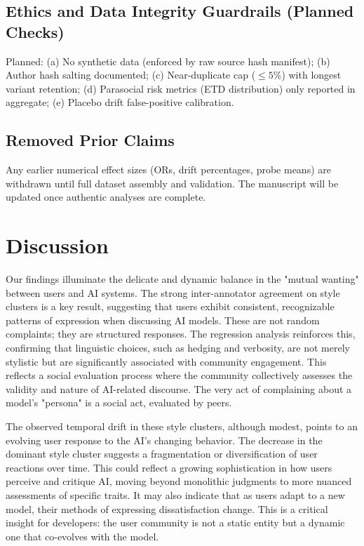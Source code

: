 \documentclass{article}
\begin{document}
\subsection*{Ethics and Data Integrity Guardrails (Planned Checks)}
Planned: (a) No synthetic data (enforced by raw source hash manifest); (b) Author hash salting documented; (c) Near-duplicate cap ($\leq 5$\%) with longest variant retention; (d) Parasocial risk metrics (ETD distribution) only reported in aggregate; (e) Placebo drift false-positive calibration.

\subsection*{Removed Prior Claims}
Any earlier numerical effect sizes (ORs, drift percentages, probe means) are withdrawn until full dataset assembly and validation. The manuscript will be updated once authentic analyses are complete.


\section{Discussion}
Our findings illuminate the delicate and dynamic balance in the "mutual wanting" between users and AI systems. The strong inter-annotator agreement on style clusters is a key result, suggesting that users exhibit consistent, recognizable patterns of expression when discussing AI models. These are not random complaints; they are structured responses. The regression analysis reinforces this, confirming that linguistic choices, such as hedging and verbosity, are not merely stylistic but are significantly associated with community engagement. This reflects a social evaluation process where the community collectively assesses the validity and nature of AI-related discourse. The very act of complaining about a model's "persona" is a social act, evaluated by peers.

The observed temporal drift in these style clusters, although modest, points to an evolving user response to the AI's changing behavior. The decrease in the dominant style cluster suggests a fragmentation or diversification of user reactions over time. This could reflect a growing sophistication in how users perceive and critique AI, moving beyond monolithic judgments to more nuanced assessments of specific traits. It may also indicate that as users adapt to a new model, their methods of expressing dissatisfaction change. This is a critical insight for developers: the user community is not a static entity but a dynamic one that co-evolves with the model.
\end{document}
